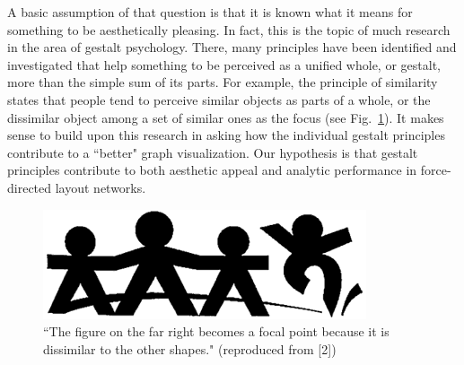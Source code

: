 \documentclass[12pt, twocolumn]{article}
\begin{document}
A basic assumption of that question is that it is known what it means for something to be aesthetically pleasing. 
In fact, this is the topic of much research in the area of gestalt psychology. 
There, many principles have been identified and investigated that help something to be perceived as a unified whole, or gestalt, more than the simple sum of its parts. 
For example, the principle of similarity states that people tend to perceive similar objects as parts of a whole, or the dissimilar object among a set of similar ones as the focus (see Fig.~\ref{fig:sim}). 
It makes sense to build upon this research in asking how the individual gestalt principles contribute to a ``better" graph visualization.
Our hypothesis is that gestalt principles contribute to both aesthetic appeal and analytic performance in force-directed layout networks.
\begin{figure}[b]
	\caption{\small ``The figure on the far right becomes a focal point because it is dissimilar to the other shapes." (reproduced from [2])}
	\label{fig:sim}
	\includegraphics[width=.9\linewidth]{anomaly01.png}
\end{figure}
\\
\end{document}
